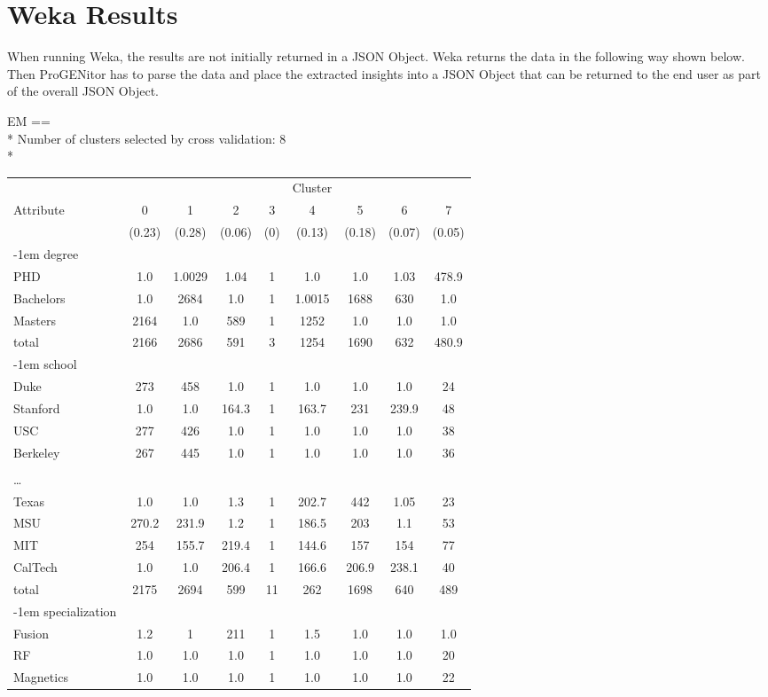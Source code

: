 \section{Weka Results}
\label{sect:weka-results}
When running Weka, the results are not initially returned in a JSON Object. 
Weka returns the data in the following way shown below.  Then ProGENitor has to
parse the data and place the extracted insights into a JSON Object that can be
returned to the end user as part of the overall JSON Object.

\pagebreak 
\noindent EM
\noindent ==\\*
\noindent Number of clusters selected by cross validation: 8\\*                           
\begin{tabular}{lcccccccc} 
&&&&&Cluster\\
Attribute&0&1&2&3&4&5&6&7\\
&(0.23)&(0.28)&(0.06)&(0)&(0.13)&(0.18)&(0.07)&(0.05)\\
\kern-1em degree\\
PHD&1.0&1.0029&1.04&1&1.0&1.0&1.03&478.9\\
Bachelors&1.0&2684&1.0&1&1.0015&1688&630&1.0\\
Masters&2164&1.0&589&1&1252&1.0&1.0&1.0\\
total&2166&2686&591&3&1254&1690&632&480.9\\
\kern-1em school\\
Duke&273&458&1.0&1&1.0&1.0&1.0&24\\
Stanford&1.0&1.0&164.3&1&163.7&231&239.9&48\\
USC&277&426&1.0&1&1.0&1.0&1.0&38\\
Berkeley&267&445&1.0&1&1.0&1.0&1.0&36\\
\\ \ldots\\
Texas&1.0&1.0&1.3&1&202.7&442&1.05&23\\ 
MSU&270.2&231.9&1.2&1&186.5&203&1.1&53\\
MIT&254&155.7&219.4&1&144.6&157&154&77\\
CalTech&1.0&1.0&206.4&1&166.6&206.9&238.1&40\\ 
total&2175&2694&599&11&262&1698&640&489\\
\kern-1em specialization\\ 
Fusion&1.2&1&211&1&1.5&1.0&1.0&1.0\\ 
RF&1.0&1.0&1.0&1&1.0&1.0&1.0&20\\ 
Magnetics&1.0&1.0&1.0&1&1.0&1.0&1.0&22\\

\end{tabular}
